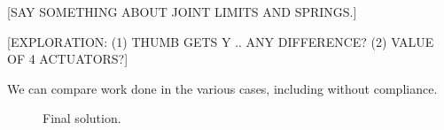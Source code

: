 [SAY SOMETHING ABOUT JOINT LIMITS AND SPRINGS.]

[EXPLORATION:   (1) THUMB GETS Y .. ANY DIFFERENCE?   (2) VALUE OF 4 ACTUATORS?]

We can compare work done in the various cases, including without compliance.

\begin{figure}
\begin{center}
\vspace*{2in}
\end{center}
\caption[]{Final solution.}
\label{SimpleExampleResults}
\end{figure}


